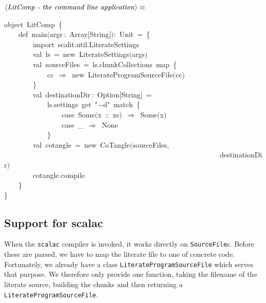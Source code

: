 \documentclass[a4paper,12pt]{article}
\begin{document}
$\left<\mbox{\emph{LitComp - the command line application}}\right>\equiv$
\begin{program}{\vem object}~LitComp~{\small\{}
\\~~~~{\vem def}~main$($args\,{\rm :}~Array$[$String$]$$)${\rm :}~Unit~=~{\small\{}
\\~~~~~~~~{\vem import}~scalit.util.LiterateSettings
\\[0.5em]~~~~~~~~{\vem val}~ls~=~{\vem new}~LiterateSettings$($args$)$
\\[0.5em]~~~~~~~~{\vem val}~sourceFiles~=~ls.chunkCollections~map~{\small\{}
\\~~~~~~~~~~~~cc~$\Rightarrow$~{\vem new}~LiterateProgramSourceFile$($cc$)$
\\~~~~~~~~{\small\}}
\\[0.5em]~~~~~~~~{\vem val}~destinationDir\,{\rm :}~Option$[$String$]$~=
\\~~~~~~~~~~~~ls.settings~get~"$-$d"~{\vem match}~{\small\{}
\\~~~~~~~~~~~~~~~~{\vem case}~Some$($x~{\rm :}{\rm :}~xs$)$~$\Rightarrow$~Some$($x$)$
\\~~~~~~~~~~~~~~~~{\vem case}~\_~$\Rightarrow$~None
\\~~~~~~~~~~~~{\small\}}
\\[0.5em]~~~~~~~~{\vem val}~cotangle~=~{\vem new}~CoTangle$($sourceFiles,
\\~~~~~~~~~~~~~~~~~~~~~~~~~~~~~~~~~~~~~~~~~~~~~~~~~~~~~~~~~~~~destinationDir$)$
\\[0.5em]~~~~~~~~cotangle.compile
\\~~~~{\small\}}
\\{\small\}}
\\[0.5em]\end{program}
\subsection{Support for scalac}
When the \texttt{scalac} compiler is invoked, it works directly on \texttt{SourceFile}s. Before these
are parsed, we have to map the literate file to one of concrete code. Fortunately, we already
have a class \texttt{LiterateProgramSourceFile} which serves that purpose. We therefore only provide
one function, taking the filename of the literate source, building the chunks and then returning
a \texttt{LiterateProgramSourceFile}.
\end{document}
